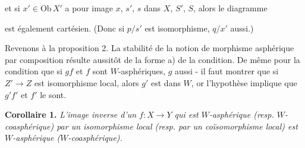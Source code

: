 \documentclass[11pt,leqno]{article}
\newcommand{\printedpage}[1]{\marginpar{\footnotesize p.~#1}}
\newcommand{\msp}[1]{\marginpar{\footnotesize [#1]}}
\newcommand{\Ob}{\mathrm{Ob}\,}
\begin{document}
\begin{center}
\end{center}

et si $x' \in \Ob X'$ a pour image $x$, $s'$, $s$ dans $X$, $S'$, $S$, alors le diagramme

\begin{center}
\end{center}

est également cartésien. (Donc si $p/s'$ est isomorphisme, $q/x'$ aussi.)

\printedpage{21}

\msp{page 25}Revenons à la proposition 2. La stabilité de la notion de morphisme asphérique par composition résulte aussitôt de la forme a) de la condition. De même pour la condition que si $gf$ et $f$ sont $W$-asphériques, $g$ aussi - il faut montrer que si $Z' \longrightarrow Z$ est isomorphisme local, alors $g'$ est dans $W$, or l'hypothèse implique que $g'f'$ et $f'$ le sont.

\begin{center}
\end{center}

\textbf{Corollaire 1.} \textit{L'image inverse d'un $f : X \longrightarrow Y$ qui est $W$-asphérique (resp. $W$-coasphérique) par un isomorphisme local (resp. par un coïsomorphisme local) est $W$-asphérique ($W$-coasphérique).}

\begin{center}
\end{center}
\end{document}
